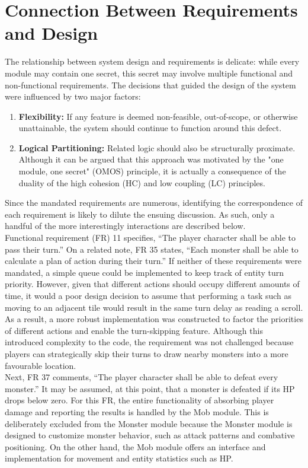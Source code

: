 \documentclass[12pt, titlepage]{article}
\newcommand{\newSection}[1]{
  \newpage
  \section{#1}
}
\begin{document}
\newSection{Connection Between Requirements and Design} \label{SecConnection}

    The relationship between system design and requirements is delicate: while every module may contain one secret, this secret may involve multiple functional and non-functional requirements.   The decisions that guided the design of the system were influenced by two major factors:

    \begin{enumerate}
        \item \textbf{Flexibility:} If any feature is deemed non-feasible, out-of-scope, or otherwise unattainable, the system should continue to function around this defect.
        \item \textbf{Logical Partitioning:} Related logic should also be structurally proximate.  Although it can be argued that this approach was motivated by the "one module, one secret" (OMOS) principle, it is actually a consequence of the duality of the high cohesion (HC) and low coupling (LC) principles.
    \end{enumerate}

    Since the mandated requirements are numerous, identifying the correspondence of each requirement is likely to dilute the ensuing discussion.  As such, only a handful of the more interestingly interactions are described below.\\

    Functional requirement (FR) 11 specifies, ``The player character shall be able to pass their turn.''  On a related note, FR 35 states, ``Each monster shall be able to calculate a plan of action during their turn.''  If neither of these requirements were mandated, a simple queue could be implemented to keep track of entity turn priority.  However, given that different actions should occupy different amounts of time, it would a poor design decision to assume that performing a task such as moving to an adjacent tile would result in the same turn delay as reading a scroll.  As a result, a more robust  implementation was constructed to factor the priorities of different actions and enable the turn-skipping feature.  Although this introduced complexity to the code, the requirement was not challenged because players can strategically skip their turns to draw nearby monsters into a more favourable location.\\

    Next, FR 37 comments, ``The player character shall be able to defeat every monster.''  It may be assumed, at this point, that a monster is defeated if its HP drops below zero.  For this FR, the entire functionality of absorbing player damage and reporting the results is handled by the Mob module.  This is deliberately excluded from the Monster module because the Monster module is designed to customize monster behavior, such as attack patterns and combative positioning.  On the other hand, the Mob module offers an interface and implementation for movement and entity statistics such as HP.\\
\end{document}
